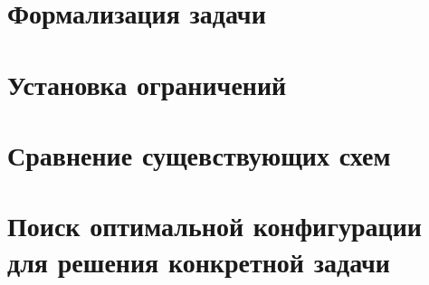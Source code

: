 \section{Формализация задачи}

\section{Установка ограничений}


\section{Сравнение сущевствующих схем}

\section{Поиск оптимальной конфигурации для решения конкретной задачи}

